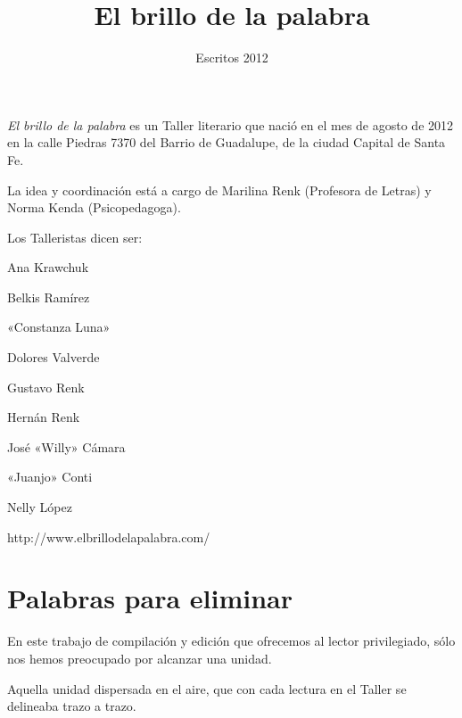 \documentclass[11pt,twoside,openright,a5paper]{book}
\title{El brillo de la palabra}
\author{Escritos 2012}
\date{}
\begin{document}
\pagestyle{plain}

\maketitle
\cleardoublepage
\emph{El brillo de la palabra} es un Taller literario que nació en el mes de agosto de 2012 en la calle Piedras 7370 del Barrio de Guadalupe, de la ciudad Capital de Santa Fe.

La idea y coordinación está a cargo de Marilina Renk (Profesora de Letras) y Norma Kenda (Psicopedagoga).

\vspace{1cm}

Los Talleristas dicen ser:

\vspace{0.5cm}

Ana Krawchuk

Belkis  Ramírez

«Constanza Luna»

Dolores Valverde

Gustavo Renk

Hernán Renk

José «Willy» Cámara

«Juanjo» Conti

Nelly López

\vspace{1.5cm}


\begin{center}
http://www.elbrillodelapalabra.com/
\end{center}

\setlength{\parskip}{0pt plus 1pt}


\tableofcontents

\chapter*{Palabras para eliminar}

En este trabajo de compilación y edición que ofrecemos al lector privilegiado, sólo nos hemos preocupado por alcanzar una unidad. 

Aquella unidad dispersada en el aire, que con cada lectura en el Taller se delineaba trazo  a trazo. 
\end{document}
